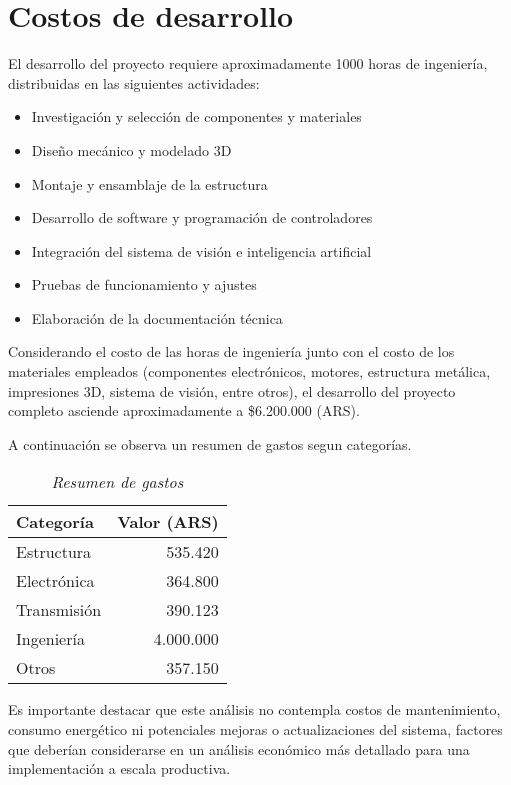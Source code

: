\section{Costos de desarrollo}

El desarrollo del proyecto requiere aproximadamente 1000 horas de ingeniería, distribuidas en las siguientes actividades:

\begin{itemize}[label=$\bullet$]
    \item Investigación y selección de componentes y materiales
    \item Diseño mecánico y modelado 3D
    \item Montaje y ensamblaje de la estructura
    \item Desarrollo de software y programación de controladores
    \item Integración del sistema de visión e inteligencia artificial
    \item Pruebas de funcionamiento y ajustes
    \item Elaboración de la documentación técnica
\end{itemize}

Considerando el costo de las horas de ingeniería junto con el costo de los materiales empleados (componentes electrónicos, motores, estructura metálica, impresiones 3D, sistema de visión, entre otros), el desarrollo del proyecto completo asciende aproximadamente a \$6.200.000 (ARS).

A continuación se observa un resumen de gastos segun categorías.

\begin{table}[h]
\centering
\begin{tabular}{|l|r|}
\hline
\textbf{Categoría} & \textbf{Valor (ARS)} \\
\hline
Estructura & 535.420 \\
\hline
Electrónica & 364.800 \\
\hline
Transmisión & 390.123 \\
\hline
Ingeniería & 4.000.000 \\
\hline
Otros & 357.150 \\
\hline
\end{tabular}
\caption{\textit{Resumen de gastos}}
\end{table}

Es importante destacar que este análisis no contempla costos de mantenimiento, consumo energético ni potenciales mejoras o actualizaciones del sistema, factores que deberían considerarse en un análisis económico más detallado para una implementación a escala productiva.

